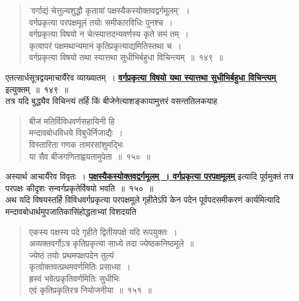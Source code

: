 \documentclass[11pt, openany]{book}
\begin{document}
 \begin{quote}
     \ab 
      'वर्गाद्यं चेत्तुल्यशुद्धौ कृतायां पक्षस्यैकस्योक्तवद्वर्गमूलम्'~।\\
 वर्गप्रकृत्या परपक्षमूलं तयोः समीकारविधिः पुनश्च~। \\
 वर्गप्रकृत्या विषयो न चेत्स्यात्तदन्यवर्णस्य कृते समं तम्~। \\
 कृत्वापरं पक्षमथान्यमानं कृतिप्रकृत्याद्यमितिस्तथा च~। \\
 वर्गप्रकृत्या विषयो तथा स्यात्तथा सुधीभिर्बहुधा विचिन्त्यम्~॥~१४९~॥ 
 \end{quote}

 एतत्सार्धसूत्रद्वयमाचार्यैरेव व्याख्यातम्~। \hyperref[149]{\textbf{वर्गप्रकृत्या विषयो यथा स्यात्तथा सुधीभिर्बहुधा विचिन्त्यम्}} इत्युक्तम्~॥~१४९~॥~\\

\vspace{-2mm}
तत्र यदि बुद्ध्यैव विचिन्त्यं तर्हि किं बीजेनेत्याशङ्कायामुत्तरं वसन्ततिलकयाह\textendash
\begin{quote}
    \ab 
    बीजं मतिर्विविधवर्णसहायिनी हि \\
    मन्दावबोधविधये विबुधैर्निजाद्यैः~। \\
विस्तारिता गणक तामरसांशुमद्भिः \\
या सैव बीजगणिताह्वयतामुपेता~॥~१५०~॥
\end{quote}

 अस्यार्थ आचार्यैरेव विवृतः~। \hyperref[149]{\textbf{पक्षस्यैकस्योक्तवद्वर्गमूलम्~। वर्गप्रकृत्या परपक्षमूलम्}} इत्यादि पूर्वमुक्तं तत्र परपक्षः कीदृशः सन्वर्गप्रकृतेर्विषयो भवति~॥~१५०~॥\\
 
\vspace{-2mm}
 अथ यदि विषयस्तर्हि विविधवर्गप्रकृत्या परपक्षमूले गृहीतेऽपि केन
पदेन पूर्वपदसमीकरणं कार्यमित्यादि मन्दावबोधार्थमुपजातिकासिंहोद्धताभ्यां
विशदयति\textendash

\thispagestyle{empty}
\afterpage{\fancyhead[LE,RO]{\thepage}}
\cfoot{}
\newpage

 \label{151}
\begin{quote}
    \ab 
    एकस्य पक्षस्य पदे गृहीते द्वितीयपक्षे यदि रूपयुक्तः~।\\
 अव्यक्तवर्गोऽत्र कृतिप्रकृत्या साध्ये तदा ज्येष्ठकनिष्ठमूले~॥\\
 ज्येष्ठं तयोः प्रथमपक्षपदेन तुल्यं \\
 कृत्वोक्तवत्प्रथमवर्णमितिः प्रसाध्या~।\\
 ह्रस्वं भवेत्प्रकृतिवर्णमितिः सुधीभिः\\
 एवं कृतिप्रकृतिरत्र नियोजनीया~॥~१५१~॥
\end{quote}
 
\end{document}
